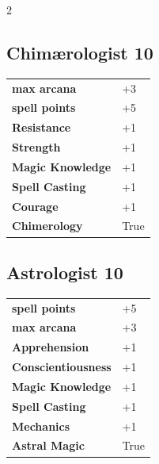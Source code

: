 \begin{multicols}{2}
\begin{tcolorbox}

\end{tcolorbox}

\begin{tcolorbox}
    \subsection*{Chimærologist \hfill \small{10 }}
    \tcblower




\begin{tabular}{@{}ll@{}}
    \textbf{max arcana} & +3\\
    \textbf{spell points} & +5\\
    \textbf{Resistance} & +1\\
    \textbf{Strength} & +1\\
    \textbf{Magic Knowledge} & +1\\
    \textbf{Spell Casting} & +1\\
    \textbf{Courage} & +1\\
    \textbf{Chimerology} & True\\
\end{tabular}


\end{tcolorbox}

\begin{tcolorbox}
    \subsection*{Astrologist \hfill \small{10 }}
    \tcblower




\begin{tabular}{@{}ll@{}}
    \textbf{spell points} & +5\\
    \textbf{max arcana} & +3\\
    \textbf{Apprehension} & +1\\
    \textbf{Conscientiousness} & +1\\
    \textbf{Magic Knowledge} & +1\\
    \textbf{Spell Casting} & +1\\
    \textbf{Mechanics} & +1\\
    \textbf{Astral Magic} & True\\
\end{tabular}


\end{tcolorbox}
\end{multicols}
